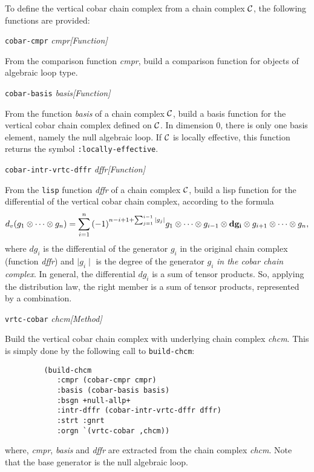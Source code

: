 To define the vertical cobar chain complex
from a chain complex ${\cal C}$, the following functions are provided:
\vskip 0.35cm
{\parindent=0mm
{\leftskip=5mm
{\tt cobar-cmpr} {\em cmpr}\hfill {\em [Function]} \par}
{\leftskip=15mm
From the comparison function {\em cmpr}, build a comparison function for objects
of algebraic loop type. \par}
{\leftskip=5mm
{\tt cobar-basis} {\em basis}\hfill {\em [Function]} \par}
{\leftskip=15mm
From the function {\em basis} of a  chain complex ${\cal C}$, build a basis
function for the vertical cobar chain complex defined on ${\cal C}$. In dimension $0$, there
is only one basis element, namely the null algebraic loop. If ${\cal C}$ is locally effective,
this function returns the symbol {\tt :locally-effective}. \par}
{\leftskip=5mm
{\tt cobar-intr-vrtc-dffr} {\em dffr}\hfill {\em [Function]} \par}
{\leftskip=15mm
From the {\tt lisp} function {\em dffr} of a chain complex  ${\cal C}$, build a
lisp function for the differential of the vertical cobar chain complex, according to the formula
$$d_v(g_1 \otimes \cdots \otimes g_n)=
\sum_{i=1}^n{(-1)^{n-i+1+{\sum_{j=1}^{i-1}{\mid g_j \mid}}}
  g_1 \otimes \cdots \otimes g_{i-1} \otimes {\bf dg_i} \otimes g_{i+1} \otimes \cdots \otimes g_n},$$
where $dg_i$ is the differential of the generator $g_i$ in the original chain complex (function {\em dffr})
and $\mid g_i \mid$ is the degree of the generator $g_i$ {\em in the cobar chain complex}.
In general, the differential $dg_i$ is a sum of tensor products.
So, applying the distribution law, the right member is a sum of tensor products, represented by a combination. \par}
{\leftskip=5mm
{\tt vrtc-cobar} {\em chcm}\hfill {\em [Method]} \par}
{\leftskip=15mm
Build the vertical cobar chain complex with underlying chain complex {\em chcm}. This is simply done by the following
call to {\tt build-chcm}:
{\footnotesize\begin{verbatim}
         (build-chcm
            :cmpr (cobar-cmpr cmpr)
            :basis (cobar-basis basis)
            :bsgn +null-allp+
            :intr-dffr (cobar-intr-vrtc-dffr dffr)
            :strt :gnrt
            :orgn `(vrtc-cobar ,chcm))
\end{verbatim}}
where, {\em cmpr}, {\em basis} and {\em dffr} are extracted from the chain complex {\em chcm}. Note that
the base generator is the null algebraic loop. \par}
}

